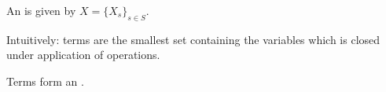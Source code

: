 \documentclass[landscape, slides, light]{mmiss}
\begin{document}
\begin{Package}
\begin{Section}
\begin{Paragraph}[Label=Terms, Title={Terms over a Set}]
An  is given by $X=
\{X_s\}_{s\in S}$.

Intuitively: terms are the smallest set containing the variables which
is closed under application of operations.
\vspace{1cm}

\begin{Lemma}[Label=TermAlgebra, Title={The Term Algebra}]
Terms form an .  
\end{Lemma}

\end{Paragraph}

\end{Section}
\end{Package}
\end{document}

